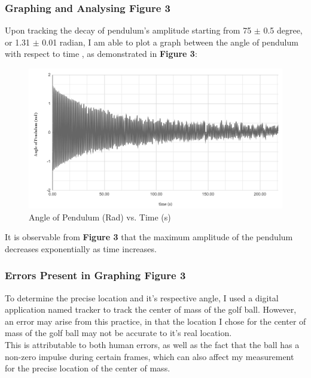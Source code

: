 \documentclass{article}
\begin{document}
\subsubsection{Graphing and Analysing Figure 3}

Upon tracking the decay of pendulum's amplitude starting from 75  $\pm$ 0.5 degree, or 1.31 $\pm$ 0.01 radian, I am able to plot a graph between the angle of pendulum with respect to time , as demonstrated in \textbf{Figure 3}:\\

\begin{figure}[!htb]
	\centering
	\includegraphics[scale=0.53]{Pendulum_Decay_Chart1.png}
	\caption{Angle of Pendulum (Rad) vs. Time (s)}
	\label{fig_angle}
\end{figure}

\noindent It is observable from \textbf{Figure 3} that the maximum amplitude of the pendulum decreases exponentially as time increases.
\subsubsection{Errors Present in Graphing Figure 3}

To determine the precise location and it's respective angle, I used a digital application named tracker to track the center of mass of the golf ball. However, an error may arise from this practice, in that the location I chose for the center of mass of the golf ball may not be accurate to it's real location. \\

\noindent This is attributable to both human errors, as well as the fact that the ball has a non-zero impulse during certain frames, which can also affect my measurement for the precise location of the center of mass.\\
\end{document}
